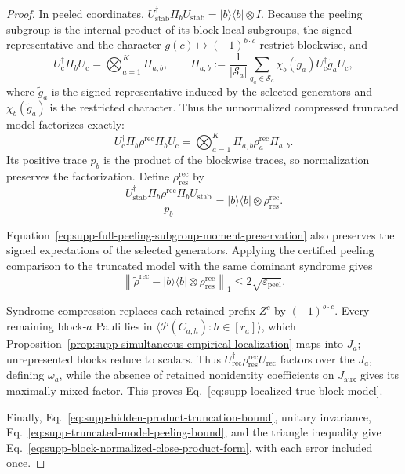 \documentclass[
  aps,
  prx,
  reprint,
  superscriptaddress,
  amsmath,
  amssymb,
  nofootinbib,
  longbibliography
]{revtex4-2}
\begin{document}
\begin{proof}
In peeled coordinates,
$U_{\mathrm{stab}}^\dagger\Pi_bU_{\mathrm{stab}}
=|b\rangle\!\langle b|\otimes I$.  Because the peeling subgroup is the
internal product of its block-local subgroups, the signed representative
and the character $g(c)\mapsto(-1)^{b\cdot c}$ restrict blockwise, and
\begin{equation}
U_{\mathrm c}^\dagger\Pi_bU_{\mathrm c}
=
\bigotimes_{a=1}^K\Pi_{a,b},
\qquad
\Pi_{a,b}
:=
\frac{1}{|\mathcal S_a|}
\sum_{g_a\in\mathcal S_a}
\chi_b(\widetilde g_a)
U_{\mathrm c}^\dagger\widetilde g_aU_{\mathrm c},
\label{eq:supp-blockwise-syndrome-projector-factorization}
\end{equation}
where $\widetilde g_a$ is the signed representative induced by the
selected generators and $\chi_b(\widetilde g_a)$ is the restricted
character.
Thus the unnormalized compressed truncated model factorizes exactly:
\begin{equation}
U_{\mathrm c}^\dagger
\Pi_b\rho^{\mathrm{rec}}\Pi_b
U_{\mathrm c}
=
\bigotimes_{a=1}^K
\Pi_{a,b}\rho_a^{\mathrm{rec}}\Pi_{a,b}.
\label{eq:supp-unnormalized-compressed-product-factorization}
\end{equation}
Its positive trace $p_b$ is the product of the blockwise traces, so
normalization preserves the factorization.  Define
$\rho_{\mathrm{res}}^{\mathrm{rec}}$ by
\begin{equation}
\frac{
U_{\mathrm{stab}}^\dagger
\Pi_b\rho^{\mathrm{rec}}\Pi_b
U_{\mathrm{stab}}
}{p_b}
=
|b\rangle\!\langle b|
\otimes
\rho_{\mathrm{res}}^{\mathrm{rec}}.
\label{eq:supp-normalized-compressed-residual-state}
\end{equation}

Equation~\eqref{eq:supp-full-peeling-subgroup-moment-preservation} also
preserves the signed expectations of the selected generators.  Applying
the certified peeling comparison to the truncated model with the same
dominant syndrome gives
\begin{equation}
\left\|
\tilde\rho^{\mathrm{rec}}
-
|b\rangle\!\langle b|
\otimes\rho_{\mathrm{res}}^{\mathrm{rec}}
\right\|_1
\le
2\sqrt{\varepsilon_{\mathrm{peel}}}.
\label{eq:supp-truncated-model-peeling-bound}
\end{equation}

Syndrome compression replaces each retained prefix $Z^c$ by
$(-1)^{b\cdot c}$.  Every remaining block-$a$ Pauli lies in
$\langle\mathcal P(C_{a,h}):h\in[r_a]\rangle$, which
Proposition~\ref{prop:supp-simultaneous-empirical-localization} maps into
$J_a$; unrepresented blocks reduce to scalars.  Thus
$U_{\mathrm{rec}}^\dagger\rho_{\mathrm{res}}^{\mathrm{rec}}U_{\mathrm{rec}}$
factors over the $J_a$, defining $\omega_a$, while the absence of retained
nonidentity coefficients on $J_{\mathrm{aux}}$ gives its maximally mixed
factor.  This proves Eq.~\eqref{eq:supp-localized-true-block-model}.

Finally, Eq.~\eqref{eq:supp-hidden-product-truncation-bound}, unitary
invariance, Eq.~\eqref{eq:supp-truncated-model-peeling-bound}, and the
triangle inequality give
Eq.~\eqref{eq:supp-block-normalized-close-product-form}, with each error
included once.
\end{proof}
\end{document}
